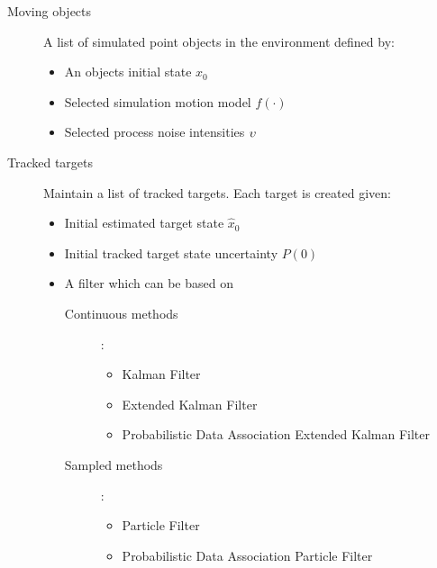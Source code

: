 \begin{description}
	\item[Moving objects] A list of simulated point objects in the environment defined by:
	\begin{itemize}
		\item An objects initial state $x_0$
		\item Selected simulation motion model $f(\cdot)$
		\item Selected process noise intensities $ {\upsilon} $
	\end{itemize}
\end{description}

\begin{description}
	\item[Tracked targets] Maintain a list of tracked targets. Each target is created given:
	\begin{itemize}
		\item Initial estimated target state $\hat{x}_0$
		\item Initial tracked target state uncertainty $P(0)$
		\item A filter which can be based on
			\begin{description}
				\item[Continuous methods]:
					\begin{itemize}
						\item Kalman Filter
						\item Extended Kalman Filter
						\item Probabilistic Data Association Extended Kalman Filter
					\end{itemize}		
			\end{description}
			\begin{description}
				\item[Sampled methods]:
					\begin{itemize}
						\item Particle Filter
						\item Probabilistic Data Association Particle Filter
					\end{itemize}
			\end{description}			
	\end{itemize}
\end{description}


